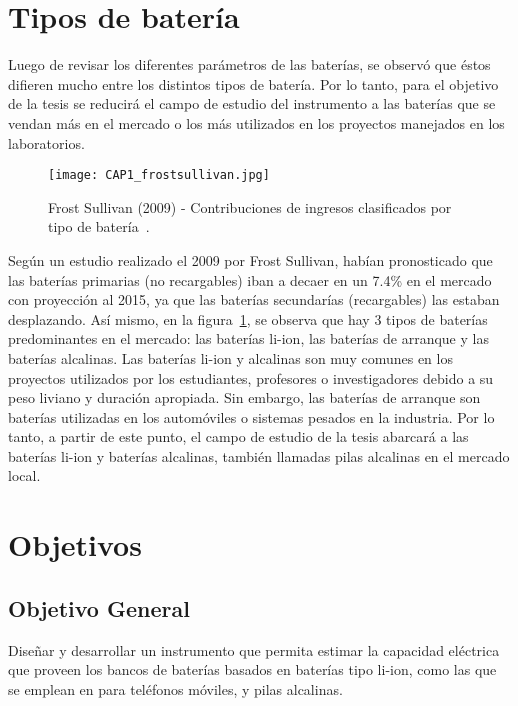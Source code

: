 \section{Tipos de batería}

Luego de revisar los diferentes parámetros de las baterías, se observó que éstos difieren mucho entre los distintos tipos de batería. Por lo tanto, para el objetivo de la tesis se reducirá el campo de estudio del instrumento a las baterías que se vendan más en el mercado o los más utilizados en los proyectos manejados en los laboratorios.

\begin{figure}[htbp]
\begin{center}
\texttt{[image: CAP1\_frostsullivan.jpg]}
\caption{Frost Sullivan (2009) - Contribuciones de ingresos clasificados por tipo de batería~\cite{Buchmann2011}.}
\label{fig:frostsullivan}
\end{center}
\end{figure}

Según un estudio realizado el 2009 por Frost Sullivan, habían pronosticado que las baterías primarias (no recargables) iban a decaer en un 7.4\% en el mercado con proyección al 2015, ya que las baterías secundarías (recargables) las estaban desplazando. Así mismo, en la figura~\ref{fig:frostsullivan}, se observa que hay 3 tipos de baterías predominantes en el mercado: las baterías li-ion, las baterías de arranque y las baterías alcalinas. Las baterías li-ion y alcalinas son muy comunes en los proyectos utilizados por los estudiantes, profesores o investigadores debido a su peso liviano y duración apropiada. Sin embargo, las baterías de arranque son baterías utilizadas en los automóviles o sistemas pesados en la industria. Por lo tanto, a partir de este punto, el campo de estudio de la tesis abarcará a las baterías li-ion y baterías alcalinas, también llamadas pilas alcalinas en el mercado local.

\section{Objetivos}

\subsection{Objetivo General}

Diseñar y desarrollar un instrumento que permita estimar la capacidad eléctrica que proveen los bancos de baterías basados en baterías tipo li-ion, como las que se emplean en para teléfonos móviles, y pilas alcalinas.

